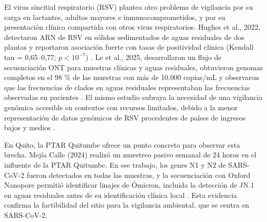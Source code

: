 El virus sincitial respiratorio (RSV) plantea otro problema de vigilancia por su carga en lactantes, adultos mayores e inmunocomprometidos, y por su presentación clínica compartida con otros virus respiratorios. Hughes et al., 2022, detectaron ARN de RSV en sólidos sedimentados de aguas residuales de dos plantas y reportaron asociación fuerte con tasas de positividad clínica (Kendall tau = 0,65--0,77; $p < 10^{-7}$) \cite{Hughes_2022}. Le et al., 2025, desarrollaron un flujo de secuenciación ONT para muestras clínicas y aguas residuales, obtuvieron genomas completos en el 98 \% de las muestras con más de 10.000 copias/mL y observaron que las frecuencias de clados en aguas residuales representaban las frecuencias observadas en pacientes \cite{Le_2025}. El mismo estudio subraya la necesidad de una vigilancia genómica accesible en contextos con recursos limitados, debido a la menor representación de datos genómicos de RSV procedentes de países de ingresos bajos y medios \cite{Le_2025}.

En Quito, la PTAR Quitumbe ofrece un punto concreto para observar esta brecha. Mejía Calle (2024) realizó un muestreo pasivo semanal de 24 horas en el influente de la PTAR Quitumbe. En ese trabajo, los genes N1 y N2 de SARS-CoV-2 fueron detectados en todas las muestras, y la secuenciación con Oxford Nanopore permitió identificar linajes de Ómicron, incluida la detección de JN.1 en aguas residuales antes de su identificación clínica local \cite{MejiaCalle_2024}. Esta evidencia confirma la factibilidad del sitio para la vigilancia ambiental, que se centra en SARS-CoV-2.